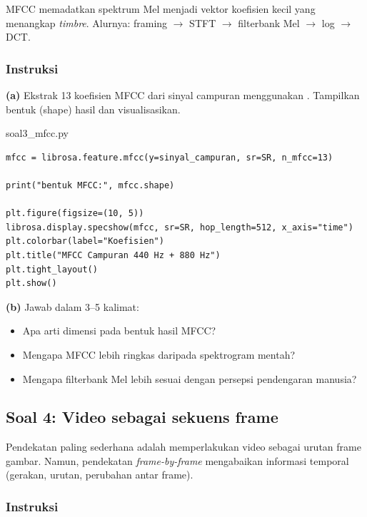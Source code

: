 \documentclass[12pt, a4paper]{article}
\begin{document}
MFCC memadatkan spektrum Mel menjadi vektor koefisien kecil yang menangkap \emph{timbre}. Alurnya: framing $\to$ STFT $\to$ filterbank Mel $\to$ log $\to$ DCT.

\subsubsection{Instruksi}
\label{sec:soal3-instruksi}

\textbf{(a)} Ekstrak 13 koefisien MFCC dari sinyal campuran menggunakan . Tampilkan bentuk (shape) hasil dan visualisasikan.

\begin{codewindow}{soal3\_mfcc.py}
\begin{lstlisting}[style=pycode]
mfcc = librosa.feature.mfcc(y=sinyal_campuran, sr=SR, n_mfcc=13)

print("bentuk MFCC:", mfcc.shape)

plt.figure(figsize=(10, 5))
librosa.display.specshow(mfcc, sr=SR, hop_length=512, x_axis="time")
plt.colorbar(label="Koefisien")
plt.title("MFCC Campuran 440 Hz + 880 Hz")
plt.tight_layout()
plt.show()
\end{lstlisting}
\end{codewindow}

\textbf{(b)} Jawab dalam 3--5 kalimat:
\begin{itemize}
  \item Apa arti dimensi pada bentuk  hasil MFCC?
  \item Mengapa MFCC lebih ringkas daripada spektrogram mentah?
  \item Mengapa filterbank Mel lebih sesuai dengan persepsi pendengaran manusia?
\end{itemize}

\clearpage
\subsection{Soal 4: Video sebagai sekuens frame}
\label{sec:soal4}

Pendekatan paling sederhana adalah memperlakukan video sebagai urutan frame gambar. Namun, pendekatan \emph{frame-by-frame} mengabaikan informasi temporal (gerakan, urutan, perubahan antar frame).

\subsubsection{Instruksi}
\label{sec:soal4-instruksi}
\end{document}

